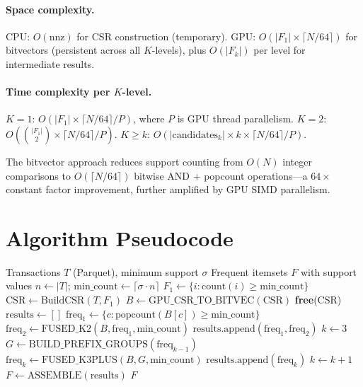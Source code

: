 \documentclass[10pt,a4paper,twocolumn]{article}
\begin{document}
\paragraph{Space complexity.}
CPU: $O(\text{nnz})$ for CSR construction (temporary). GPU: $O(|F_1| \times \lceil N/64 \rceil)$ for bitvectors (persistent across all $K$-levels), plus $O(|F_k|)$ per level for intermediate results.

\paragraph{Time complexity per $K$-level.}
$K{=}1$: $O(|F_1| \times \lceil N/64 \rceil / P)$, where $P$ is GPU thread parallelism.
$K{=}2$: $O(\binom{|F_1|}{2} \times \lceil N/64 \rceil / P)$.
$K{\geq}k$: $O(|\text{candidates}_k| \times k \times \lceil N/64 \rceil / P)$.

The bitvector approach reduces support counting from $O(N)$ integer comparisons to $O(\lceil N/64 \rceil)$ bitwise AND + popcount operations---a $64\times$ constant factor improvement, further amplified by GPU SIMD parallelism.

\section{Algorithm Pseudocode}
\label{app:pseudocode}

\begin{algorithm}[H]
\caption{ET-miner GPU-Accelerated Apriori}
\label{alg:etminer}
\begin{algorithmic}[1]
\Require Transactions $T$ (Parquet), minimum support $\sigma$
\Ensure Frequent itemsets $F$ with support values
\State $n \gets |T|$; $\text{min\_count} \gets \lceil \sigma \cdot n \rceil$
\State $F_1 \gets \{i : \text{count}(i) \geq \text{min\_count}\}$ 
\State $\text{CSR} \gets \text{BuildCSR}(T, F_1)$ 
\State $B \gets \text{GPU\_CSR\_TO\_BITVEC}(\text{CSR})$ 
\State \textbf{free}(CSR)
\State $\text{results} \gets []$
\State $\text{freq}_1 \gets \{c : \text{popcount}(B[c]) \geq \text{min\_count}\}$
\State $\text{freq}_2 \gets \text{FUSED\_K2}(B, \text{freq}_1, \text{min\_count})$
\State $\text{results.append}(\text{freq}_1, \text{freq}_2)$
\State $k \gets 3$
    \State $G \gets \text{BUILD\_PREFIX\_GROUPS}(\text{freq}_{k-1})$ 
    \State $\text{freq}_k \gets \text{FUSED\_K3PLUS}(B, G, \text{min\_count})$
    \State $\text{results.append}(\text{freq}_k)$ 
    \State $k \gets k + 1$
\EndWhile
\State $F \gets \text{ASSEMBLE}(\text{results})$ 
\State \Return $F$
\end{algorithmic}
\end{algorithm}
\end{document}
